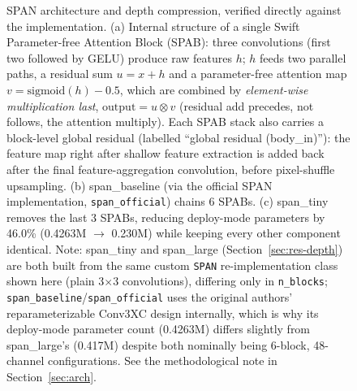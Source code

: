\documentclass[pdflatex,sn-vancouver-num]{sn-jnl}
\begin{document}
\begin{figure}[htbp]
{%
}
\caption{SPAN architecture and depth compression, verified directly against the implementation. (a) Internal structure of a single Swift Parameter-free Attention Block (SPAB): three convolutions (first two followed by GELU) produce raw features $h$; $h$ feeds two parallel paths, a residual sum $u = x + h$ and a parameter-free attention map $v = \mathrm{sigmoid}(h) - 0.5$, which are combined by \emph{element-wise multiplication last}, $\text{output} = u \otimes v$ (residual add precedes, not follows, the attention multiply). Each SPAB stack also carries a block-level global residual (labelled ``global residual (body\_in)''): the feature map right after shallow feature extraction is added back after the final feature-aggregation convolution, before pixel-shuffle upsampling. (b) span\_baseline (via the official SPAN implementation, \texttt{span\_official}) chains 6 SPABs. (c) span\_tiny removes the last 3 SPABs, reducing deploy-mode parameters by 46.0\% (0.4263M $\to$ 0.230M) while keeping every other component identical. Note: span\_tiny and span\_large (Section~\ref{sec:res-depth}) are both built from the same custom \texttt{SPAN} re-implementation class shown here (plain 3$\times$3 convolutions), differing only in \texttt{n\_blocks}; \texttt{span\_baseline}/\texttt{span\_official} uses the original authors' reparameterizable Conv3XC design internally, which is why its deploy-mode parameter count (0.4263M) differs slightly from span\_large's (0.417M) despite both nominally being 6-block, 48-channel configurations. See the methodological note in Section~\ref{sec:arch}.}
\label{fig:arch}
\end{figure}
\end{document}
